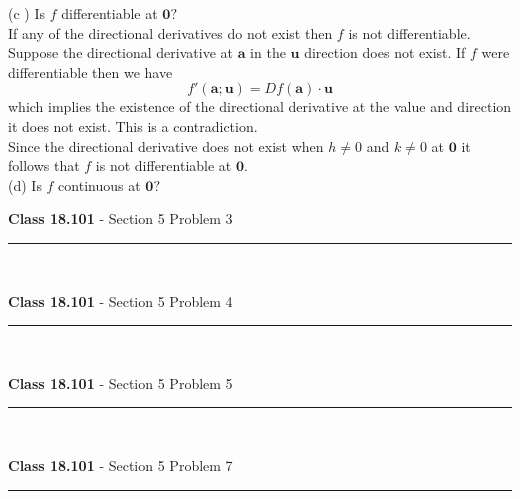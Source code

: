 \documentclass[11pt,reqno]{article}
\begin{document}
\noindent (c ) Is $f$ differentiable at $\textbf{0}?$\\

If any of the directional derivatives do not exist then $f$ is not differentiable. Suppose the directional derivative at $\textbf{a}$ in the $\textbf{u}$ direction does not exist. If $f$ were differentiable then we have 
\[ f'(\textbf{a};\textbf{u}) = Df(\textbf{a}) \cdot \textbf{u} \]
which implies the existence of the directional derivative at the value and direction it does not exist. This is a contradiction. \\
\indent Since the directional derivative does not exist when $h \neq 0$ and $k \neq 0$ at $\textbf{0}$ it follows that $f$ is not differentiable at $\textbf{0}$. \\

\noindent (d) Is $f$ continuous at $\textbf{0}?$

\vspace{15pt}
\begin{flushleft} 
\textbf{Class 18.101} - Section 5 Problem 3\\
\rule{500pt}{1pt}\\
\end{flushleft} 



\vspace{15pt}
\begin{flushleft} 
\textbf{Class 18.101} - Section 5 Problem 4\\
\rule{500pt}{1pt}\\
\end{flushleft} 

 
 
\vspace{15pt}
\begin{flushleft} 
\textbf{Class 18.101} - Section 5 Problem 5\\
\rule{500pt}{1pt}\\
\end{flushleft} 



\vspace{15pt}
\begin{flushleft} 
\textbf{Class 18.101} - Section 5 Problem 7\\
\rule{500pt}{1pt}\\
\end{flushleft} 
\end{document}
